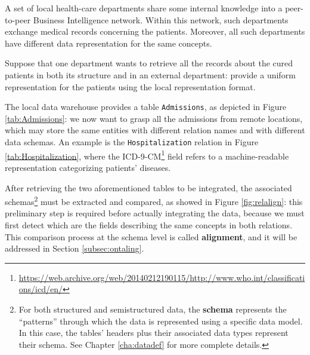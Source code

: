 \begin{example}[label=ex:firstThesis]
A  set of local health-care departments share some internal knowledge into a peer-to-peer Business Intelligence network. Within this network, such departments exchange medical records concerning the patients. Moreover, all such departments have different data representation for the same concepts.

Suppose that one department wants to retrieve all the records about the cured patients in both its structure and in an external department: provide a uniform representation for the patients using the local representation format.

The local data warehouse provides a table \texttt{Admissions}, as depicted in Figure \ref{tab:Admissions}: we now want to grasp all the admissions from remote locations, which may store the same entities with different relation names and with different data schemas. An example is the \texttt{Hospitalization} relation in Figure \ref{tab:Hospitalization}, where the ICD-9-CM\footnote{\url{https://web.archive.org/web/20140212190115/http://www.who.int/classifications/icd/en/}} field refers to a machine-readable representation categorizing patients' diseases.
\end{example}



After retrieving the two aforementioned tables to be integrated, the associated schemas\footnote{For both structured and semistructured data, the \textbf{schema} represents the ``patterns'' through which the data is represented using a specific data model. In this case, the tables' headers plus their associated data types represent their schema. See Chapter \ref{cha:datadef} for more complete details.} must be extracted and compared, as showed in Figure  \ref{fig:relalign}: this preliminary step is required before actually integrating the data, because we must first detect which are the fields describing the same concepts in both relations. This comparison process at the schema level is called \textbf{alignment}, and it will be addressed in Section \vref{subsec:ontaling}.


